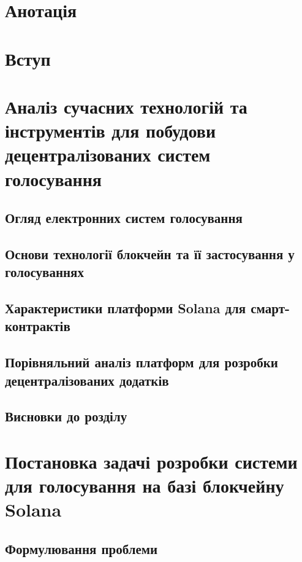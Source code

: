 \documentclass[14pt]{extreport}
\begin{document}
  \chapter*{Анотація}
  
  \tableofcontents
  \newpage
  
  \chapter*{Вступ}
  
  
  \chapter{Аналіз сучасних технологій та інструментів для побудови децентралізованих систем голосування}

  \section{Огляд електронних систем голосування}
  
  
  \section{Основи технології блокчейн та її застосування у голосуваннях}
  
  
  \section{Характеристики платформи Solana для смарт-контрактів}
  
  
  \section{Порівняльний аналіз платформ для розробки децентралізованих додатків}
  
  
  \section{Висновки до розділу}
  

  \chapter{Постановка задачі розробки системи для голосування на базі блокчейну Solana}

  \section{Формулювання проблеми}
\end{document}
